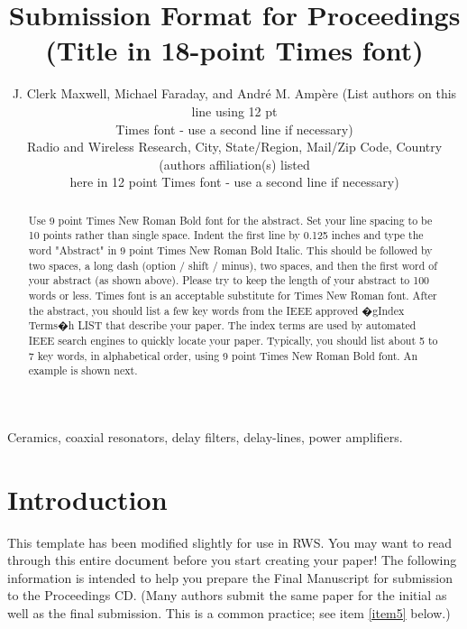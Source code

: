 \documentclass[10pt,conference,letterpaper]{RWWTemplate}
\title{Submission Format for Proceedings (Title in 18-point Times font)}
\author{%
J. Clerk Maxwell, Michael Faraday, and Andr\'{e} M. Amp\`{e}re (List authors
on this line using 12 pt\\
Times font - use a second line if necessary)%
\vspace{12pt}\\
Radio and Wireless Research, City, State/Region, Mail/Zip Code, Country
(authors affiliation(s) listed \\
here in 12 point Times font - use a second line if necessary)%
}
\begin{document}
\maketitle

%
\begin{abstract}
Use 9 point Times New Roman Bold font for the abstract. Set your line spacing to be 10 points rather than single space. Indent the first line by 0.125 inches and type the word "Abstract" in 9 point Times New Roman Bold Italic. This should be followed by two spaces, a long dash (option / shift / minus), two spaces, and then the first word of your abstract (as shown above). Please try to keep the length of your abstract to 100 words or less. Times font is an acceptable substitute for Times New Roman font. After the abstract, you should list a few key words from the IEEE approved �gIndex Terms�h LIST that describe your paper. The index terms are used by automated IEEE search engines to quickly locate your paper. Typically, you should list about 5 to 7 key words, in alphabetical order, using 9 point Times New Roman Bold font. An example is shown next.
\end{abstract}

\begin{keywords}
Ceramics, coaxial resonators, delay filters, delay-lines, power amplifiers.
\end{keywords}

\section{Introduction}
%
This template has been modified slightly for use in RWS. You may want to read through this entire document before you start creating your paper! The following information is intended to help you prepare the Final Manuscript for submission to the Proceedings CD. (Many authors submit the same paper for the initial as well as the final submission. This is a common practice; see item \ref{item5} below.) 
\end{document}
